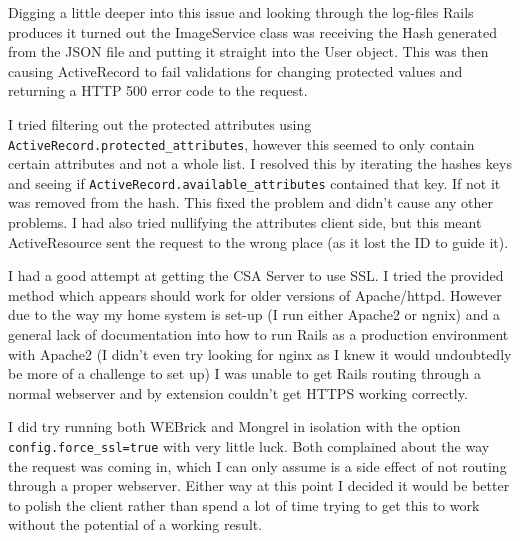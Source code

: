 \documentclass{article}
\begin{document}
Digging a little deeper into this issue and looking through the log-files Rails produces
it turned out the ImageService class was receiving the Hash generated from the JSON file
and putting it straight into the User object. This was then causing ActiveRecord to fail
validations for changing protected values and returning a HTTP 500 error code to the 
request.

I tried filtering out the protected attributes using 
\verb$ActiveRecord.protected_attributes$, however this seemed to only contain certain 
attributes and not a whole list. I resolved this by iterating the hashes keys and seeing 
if \verb$ActiveRecord.available_attributes$ contained that key. If not it was removed 
from the hash. This fixed the problem and didn't cause any other problems. I had also 
tried nullifying the attributes client side, but this meant ActiveResource sent the 
request to the wrong place (as it lost the ID to guide it).

I had a good attempt at getting the CSA Server to use SSL. I tried the provided method 
which appears should work for older versions of Apache/httpd. However due to the way my
home system is set-up (I run either Apache2 or ngnix) and a general lack of documentation
into how to run Rails as a production environment with Apache2 (I didn't even try looking
for nginx as I knew it would undoubtedly be more of a challenge to set up) I was unable
to get Rails routing through a normal webserver and by extension couldn't get HTTPS 
working correctly.

I did try running both WEBrick and Mongrel in isolation with the option 
\verb$config.force_ssl=true$ with very little luck. Both complained about the way the 
request was coming in, which I can only assume is a side effect of not routing through
a proper webserver. Either way at this point I decided it would be better to polish the
client rather than spend a lot of time trying to get this to work without the potential
of a working result.

\clearpage


\end{document}
